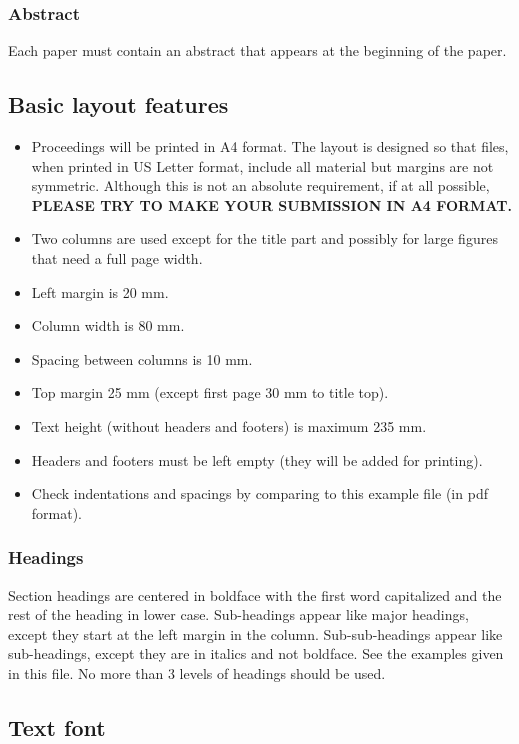 \documentclass[a4paper]{article}
\begin{document}
\subsubsection{Abstract}
Each paper must contain an abstract that appears at the beginning of the paper.

\subsection{Basic layout features}

\begin{itemize}
\item Proceedings will be printed in A4 format. The layout is designed 
so that files, when printed in US Letter format, include all material 
but margins are not symmetric. 
Although this is not an absolute requirement, if at all possible,
{\bf PLEASE TRY TO MAKE YOUR SUBMISSION IN A4 FORMAT.}
\item Two columns are used except for the title part and possibly for large 
figures that need a full page width.
\item Left margin is 20 mm.
\item Column width is 80 mm.
\item Spacing between columns is 10 mm.
\item Top margin 25 mm (except first page 30 mm to title top).
\item Text height (without headers and footers) is maximum 235 mm.
\item Headers and footers must be left empty (they will be added for 
printing).
\item Check indentations and spacings by comparing to this 
example file (in pdf format).
\end{itemize}

\subsubsection{Headings}

Section headings are centered in boldface
with the first word capitalized and the rest of the heading in 
lower case. Sub-headings appear like major headings, except they 
start at the left margin in the column.
Sub-sub-headings appear like sub-headings, except they are in italics 
and not boldface. See the examples given in this 
file. No more than 3 levels of headings should be used.

\subsection{Text font}
\end{document}
